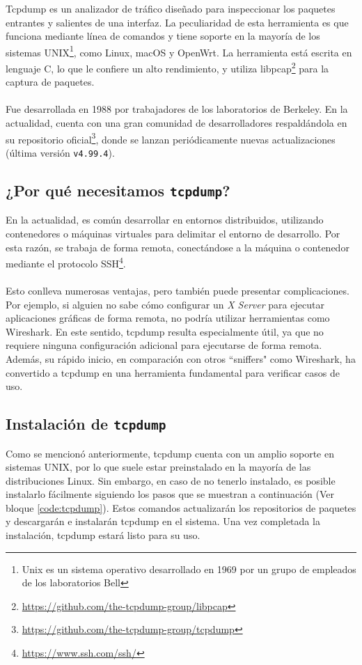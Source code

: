 Tcpdump es un analizador de tráfico diseñado para inspeccionar los paquetes entrantes y salientes de una interfaz. La peculiaridad de esta herramienta es que funciona mediante línea de comandos y tiene soporte en la mayoría de los sistemas UNIX\footnote{Unix es un sistema operativo desarrollado en 1969 por un grupo de empleados de los laboratorios Bell}, como Linux, macOS y OpenWrt. La herramienta está escrita en lenguaje C, lo que le confiere un alto rendimiento, y utiliza libpcap\footnote{\url{https://github.com/the-tcpdump-group/libpcap}} para la captura de paquetes.\\
\\
Fue desarrollada en 1988 por trabajadores de los laboratorios de Berkeley. En la actualidad, cuenta con una gran comunidad de desarrolladores respaldándola en su repositorio oficial\footnote{\url{https://github.com/the-tcpdump-group/tcpdump}}, donde se lanzan periódicamente nuevas actualizaciones (última versión \texttt{v4.99.4}).

\subsection{¿Por qué necesitamos \texttt{tcpdump}?}

En la actualidad, es común desarrollar en entornos distribuidos, utilizando contenedores o máquinas virtuales para delimitar el entorno de desarrollo. Por esta razón, se trabaja de forma remota, conectándose a la máquina o contenedor mediante el protocolo SSH\footnote{\url{https://www.ssh.com/ssh/}}.\\
\\
Esto conlleva numerosas ventajas, pero también puede presentar complicaciones. Por ejemplo, si alguien no sabe cómo configurar un \textit{X Server} para ejecutar aplicaciones gráficas de forma remota, no podría utilizar herramientas como Wireshark. En este sentido, tcpdump resulta especialmente útil, ya que no requiere ninguna configuración adicional para ejecutarse de forma remota. Además, su rápido inicio, en comparación con otros ``sniffers" como Wireshark, ha convertido a tcpdump en una herramienta fundamental para verificar casos de uso.

\subsection{Instalación de \texttt{tcpdump}}

Como se mencionó anteriormente, tcpdump cuenta con un amplio soporte en sistemas UNIX, por lo que suele estar preinstalado en la mayoría de las distribuciones Linux. Sin embargo, en caso de no tenerlo instalado, es posible instalarlo fácilmente siguiendo los pasos que se muestran a continuación (Ver bloque \ref{code:tcpdump}). Estos comandos actualizarán los repositorios de paquetes y descargarán e instalarán tcpdump en el sistema. Una vez completada la instalación, tcpdump estará listo para su uso.

